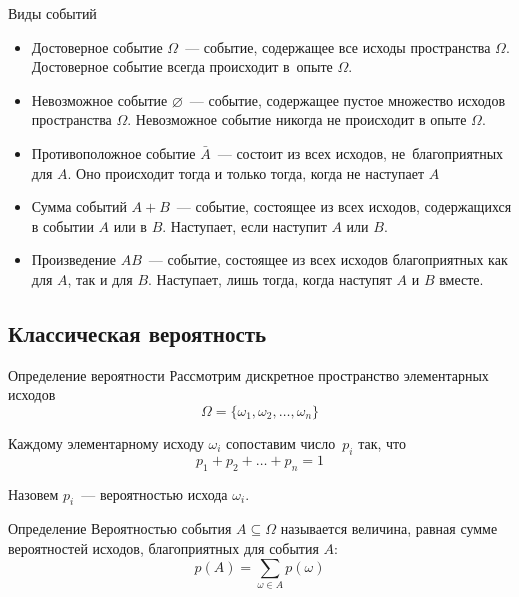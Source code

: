 \documentclass[unicode,11pt,notheorems,xcolor=table]{beamer}
\begin{document}
\begin{frame}{Виды событий}
    \begin{itemize}
        \item \alert{Достоверное событие $\Omega$}~--- событие, содержащее все исходы пространства  $\Omega$. Достоверное событие всегда происходит в~опыте $\Omega$.
        \item \alert{Невозможное событие $\varnothing$}~--- событие, содержащее пустое множество исходов пространства $\Omega$. Невозможное  событие никогда не происходит в опыте $\Omega$.
        \item \alert{Противоположное событие $\bar{A}$}~--- состоит из всех исходов, не~благоприятных для $A$. Оно происходит тогда и только тогда, когда не наступает $A$
        \item \alert{Сумма событий $A+B$}~--- событие, состоящее из всех исходов, содержащихся в событии $A$ или в $B$. Наступает, если наступит $A$ или $B$.
        \item \alert{Произведение $AB$}~--- событие, состоящее из всех исходов благоприятных как для $A$, так и для $B$. Наступает, лишь тогда, когда наступят $A$ и $B$ вместе.
    \end{itemize}

 \end{frame}

 \subsection{Классическая вероятность}
\begin{frame}{Определение вероятности}{}
    Рассмотрим дискретное пространство  элементарных исходов
    $$
        \Omega = \{\omega_1, \omega_2, \ldots, \omega_n \}
    $$

    Каждому элементарному исходу $\omega_i$ сопоставим число~$p_i$ так, что 
        $$
            p_1+p_2+\ldots+p_n = 1
        $$
        
        Назовем $p_i$~--- \alert{вероятностью исхода $\omega_i$.}

    \begin{block}{Определение}
        \alert{Вероятностью события $A\subseteq \Omega$} называется величина, равная сумме вероятностей исходов, благоприятных для события $A$:
        $$
            p(A) = \sum_{\omega\in A} p(\omega)
        $$
        
    \end{block}
\end{frame}
\end{document}
